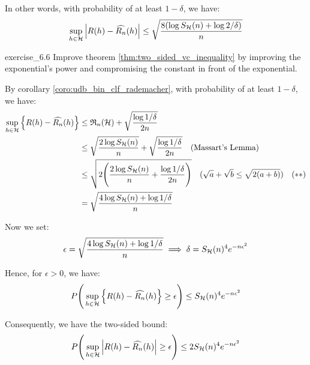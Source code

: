 \begin{solution*}
    \noindent In other words, with probability of at least $1-\delta$, we have:
    \begin{align*}
        \sup_{h\in\mathcal{H}} \Big| R(h) - \widehat{R_n}(h) \Big| \le \sqrt{
            \frac{8(\log S_{\mathcal{H}}(n) + \log 2/\delta)}{n}
        }
    \end{align*}
\end{solution*}

\begin{exercise}{}{exercise_6.6}
    Improve theorem \ref{thm:two_sided_vc_inequality} by improving the exponential's power and compromising the constant in front of the exponential.
\end{exercise}

\begin{solution*}
    By corollary \ref{coro:udb_bin_clf_rademacher}, with probability of at least $1-\delta$, we have:
    \begin{align*}
        \sup_{h\in\mathcal{H}}\Big\{ 
            R(h) - \widehat{R_n}(h)
         \Big\} &\le \mathfrak{R}_n(\mathcal{H}) + \sqrt{\frac{\log 1/\delta}{2n}} \\
        &\le \sqrt{\frac{2\log S_{\mathcal{H}}(n)}{n}} + \sqrt{\frac{\log 1/\delta}{2n}} \ \ \ \text{(Massart's Lemma)} \\
        &\le \sqrt{2\Bigg( 
            \frac{2\log S_{\mathcal{H}}(n)}{n} + \frac{\log 1/\delta}{2n}
         \Bigg)} \ \ \ (\sqrt{a} + \sqrt{b} \le \sqrt{2(a+b)}) \ \ \ (**) \\
        &= \sqrt{
            \frac{4\log S_{\mathcal{H}}(n) + \log 1/\delta}{n}
        } 
    \end{align*}

    \noindent Now we set:
    \begin{align*}
        \epsilon = \sqrt{
            \frac{4\log S_{\mathcal{H}}(n) + \log 1/\delta}{n}
        } \implies \delta = S_{\mathcal{H}}(n)^4e^{-n\epsilon^2}
    \end{align*}

    \noindent Hence, for $\epsilon>0$, we have:
    \begin{align*}
        P\Bigg( 
            \sup_{h\in\mathcal{H}}\Big\{ 
                R(h) - \widehat{R_n}(h)
             \Big\} \ge \epsilon
         \Bigg)\le S_{\mathcal{H}}(n)^4e^{-n\epsilon^2}
    \end{align*}

    \noindent Consequently, we have the two-sided bound:
    \begin{align*}
        P\Bigg( 
            \sup_{h\in\mathcal{H}}\Big| 
                R(h) - \widehat{R_n}(h)
             \Big| \ge \epsilon
         \Bigg)\le 2S_{\mathcal{H}}(n)^4e^{-n\epsilon^2}
    \end{align*}
\end{solution*}
